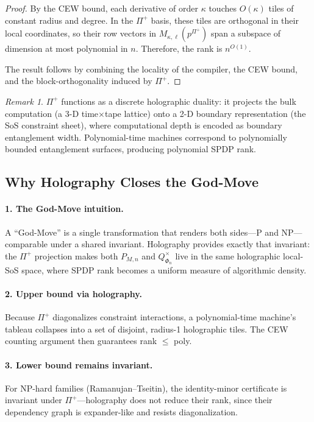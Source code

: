 \documentclass[12pt]{article}
\theoremstyle{definition}
\theoremstyle{definition}
\theoremstyle{remark}
\newtheorem{remark}{Remark}
\theoremstyle{remark}
\begin{document}
\begin{proof}
By the CEW bound, each derivative of order $\kappa$ touches $O(\kappa)$ tiles of constant radius and degree. In the $\Pi^+$ basis, these tiles are orthogonal in their local coordinates, so their row vectors in $M_{\kappa,\ell}(p^{\Pi^+})$ span a subspace of dimension at most polynomial in $n$. Therefore, the rank is $n^{O(1)}$.

The result follows by combining the locality of the compiler, the CEW bound, and the block-orthogonality induced by $\Pi^+$.
\end{proof}

\begin{remark}
$\Pi^+$ functions as a discrete holographic duality: it projects the bulk computation (a 3-D time$\times$tape lattice) onto a 2-D boundary representation (the SoS constraint sheet), where computational depth is encoded as boundary entanglement width. Polynomial-time machines correspond to polynomially bounded entanglement surfaces, producing polynomial SPDP rank.
\end{remark}

\subsection{Why Holography Closes the God-Move}

\paragraph{1. The God-Move intuition.}
A ``God-Move'' is a single transformation that renders both sides---P and NP---comparable under a shared invariant. Holography provides exactly that invariant: the $\Pi^+$ projection makes both $P_{M,n}$ and $Q^{\times}_{\Phi_n}$ live in the same holographic local-SoS space, where SPDP rank becomes a uniform measure of algorithmic density.

\paragraph{2. Upper bound via holography.}
Because $\Pi^+$ diagonalizes constraint interactions, a polynomial-time machine's tableau collapses into a set of disjoint, radius-1 holographic tiles. The CEW counting argument then guarantees rank $\leq$ poly.

\paragraph{3. Lower bound remains invariant.}
For NP-hard families (Ramanujan--Tseitin), the identity-minor certificate is invariant under $\Pi^+$---holography does not reduce their rank, since their dependency graph is expander-like and resists diagonalization.
\end{document}
